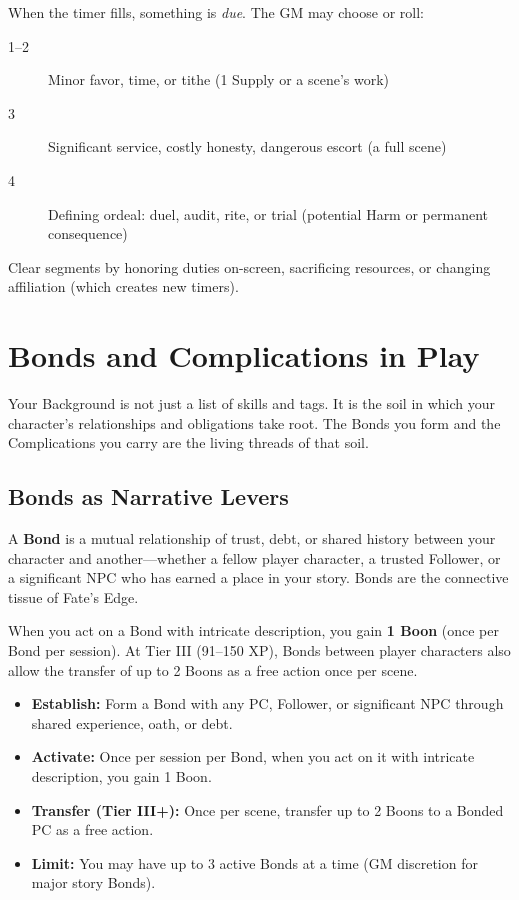 When the timer fills, something is \emph{due}. The GM may choose or roll:
\begin{description}
\item[1--2] Minor favor, time, or tithe (1 Supply or a scene's work)
\item[3] Significant service, costly honesty, dangerous escort (a full scene)
\item[4] Defining ordeal: duel, audit, rite, or trial (potential Harm or permanent consequence)
\end{description}
Clear segments by honoring duties on-screen, sacrificing resources, or changing affiliation (which creates new timers).

\section{Bonds and Complications in Play}
\label{sec:bg-bonds-complications}

Your Background is not just a list of skills and tags. It is the soil in which your character's relationships and obligations take root. The Bonds you form and the Complications you carry are the living threads of that soil.

\subsection{Bonds as Narrative Levers}

A \textbf{Bond} is a mutual relationship of trust, debt, or shared history between your character and another---whether a fellow player character, a trusted Follower, or a significant NPC who has earned a place in your story. Bonds are the connective tissue of Fate's Edge.

When you act on a Bond with intricate description, you gain \textbf{1 Boon} (once per Bond per session). At Tier III (91--150 XP), Bonds between player characters also allow the transfer of up to 2 Boons as a free action once per scene.

\begin{itemize}
  \item \textbf{Establish:} Form a Bond with any PC, Follower, or significant NPC through shared experience, oath, or debt.
  \item \textbf{Activate:} Once per session per Bond, when you act on it with intricate description, you gain 1 Boon.
  \item \textbf{Transfer (Tier III+):} Once per scene, transfer up to 2 Boons to a Bonded PC as a free action.
  \item \textbf{Limit:} You may have up to 3 active Bonds at a time (GM discretion for major story Bonds).
\end{itemize}

